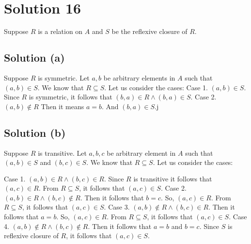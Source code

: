 \documentclass{article}
\begin{document}
\section{Solution 16}
Suppose $R$ is a relation on $A$ and $S$ be the reflexive closure of
$R$.
\subsection{Solution (a)}
Suppose $R$ is symmetric. Let $a,b$ be arbitrary elements in $A$ such
that $(a,b) \in S$. We know that $R \subseteq S$. Let us consider the
cases:
Case 1. $(a,b) \in S$. Since $R$ is symmetric, it follows that $(b,a)
\in R \land (b,a) \in S$.
Case 2. $(a,b) \notin R$ Then it means $a = b$. And $(b,a) \in S$.j

\subsection{Solution (b)}
Suppose $R$ is transitive. Let $a,b,c$ be arbitrary element in $A$
such that $(a,b) \in S$ and $(b,c) \in S$. We know that $R \subseteq
S$. Let us consider the cases:

Case 1. $(a,b) \in R \land (b,c) \in R$. Since $R$ is transitive it
follows that $(a,c) \in R$. From $R \subseteq S$, it follows that
$(a,c) \in S$.
Case 2. $(a,b) \in R \land (b,c) \notin R$. Then it follows that $b =
c$. So, $(a,c) \in R$. From $R \subseteq S$, it follows that $(a,c)
\in S$.
Case 3. $(a,b) \notin R \land (b,c) \in R$. Then it follows that $a =
b$. So, $(a,c) \in R$. From $R \subseteq S$, it follows that $(a,c)
\in S$.
Case 4. $(a,b) \notin R \land (b,c) \notin R$. Then it follows that $a
= b$ and $b = c$. Since $S$ is reflexive closure of $R$, it follows
that $(a,c) \in S$.
\end{document}
